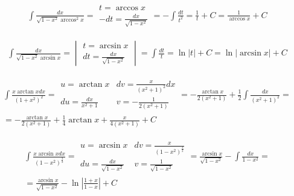 
\begin{gather*}\int \frac{dx}{\sqrt{1-x^2}\arccos^2 x} = \begin{array}{|l|} t=\arccos x \\ -dt=\frac{dx}{\sqrt{1-x^2}} \end{array} = -\int \frac{dt}{t^2} = \frac{1}{t}+C = \frac{1}{\arccos x}+C\end{gather*}



\begin{gather*}\int \frac{dx}{\sqrt{1-x^2}\arcsin x} = \begin{vmatrix} t=\arcsin x \\ dt=\frac{dx}{\sqrt{1-x^2}} \end{vmatrix} = \int \frac{dt}{t} = \ln|t|+C = \ln|\arcsin x|+C\end{gather*}



\begin{gather*}\int \frac{x\arctan x dx}{(1+x^2)^2} = \begin{array}{|ll|}
u=\arctan x & dv=\frac{x}{(x^2+1)^2}dx \\
du=\frac{dx}{x^2+1} & v=-\frac{1}{2(x^2+1)}
\end{array} = -\frac{\arctan x}{2(x^2+1)} + \frac{1}{2}\int \frac{dx}{(x^2+1)^2} =  \\
= -\frac{\arctan x}{2(x^2+1)} + \frac{1}{4}\arctan x + \frac{x}{4(x^2+1)}+C\end{gather*}



\begin{gather*}\int \frac{x\arcsin x dx}{(1-x^2)^{\frac{3}{2}}} = \begin{array}{|ll|}
u=\arcsin x & dv=\frac{x}{(1-x^2)^{\frac{3}{2}}} \\
du=\frac{dx}{\sqrt{1-x^2}} & v=\frac{1}{\sqrt{1-x^2}} \end{array} = \frac{\arcsin x}{\sqrt{1-x^2}} -\int \frac{dx}{1-x^2} =  \\
= \frac{\arcsin x}{\sqrt{1-x^2}} - \ln\left|\frac{1+x}{1-x}\right|+C\end{gather*}



